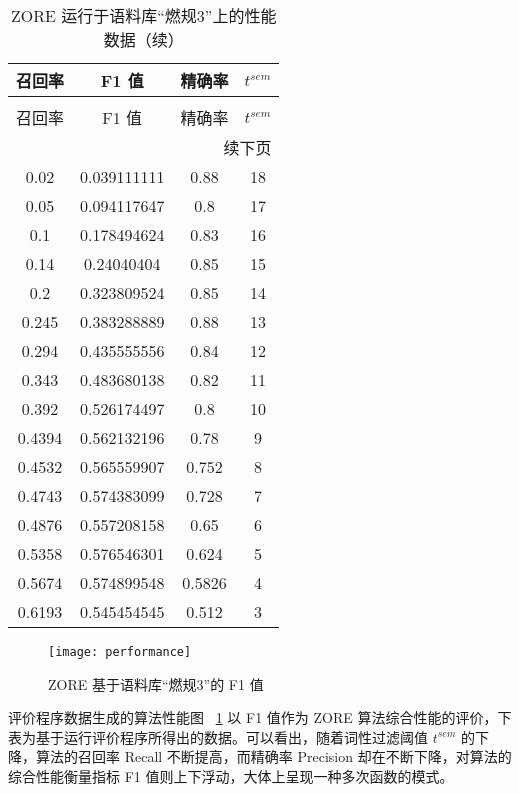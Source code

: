 \begin{longtable}{|c|c|c|c|}
\caption[ZORE 性能数据]{ZORE 运行于语料库“燃规3”上的性能数据} \label{tab:ZOREperformance} \\
\toprule[1.5pt]
 召回率 & F1 值 & 精确率 & $t^{sem}$\\
\midrule[1pt]
\endfirsthead
\caption[]{ZORE 运行于语料库“燃规3”上的性能数据（续）} \\
\toprule[1.5pt]
 召回率 & F1 值 & 精确率 & $t^{sem}$\\
\midrule[1pt]
\endhead
\hline
\multicolumn{4}{r}{\small 续下页}
\endfoot
\bottomrule[1.5pt]
\endlastfoot
0	&	0	&	1	&	19\\
    \hline
0.02	&	0.039111111	&	0.88	&	18\\
    \hline
0.05	&	0.094117647	&	0.8	&	17\\
    \hline
0.1	&	0.178494624	&	0.83	&	16\\
    \hline
0.14	&	0.24040404	&	0.85	&	15\\
    \hline
0.2	&	0.323809524	&	0.85	&	14\\
    \hline
0.245	&	0.383288889	&	0.88	&	13\\
    \hline
0.294	&	0.435555556	&	0.84	&	12\\
    \hline
0.343	&	0.483680138	&	0.82	&	11\\
    \hline
0.392	&	0.526174497	&	0.8	&	10\\
    \hline
0.4394	&	0.562132196	&	0.78	&	9\\
    \hline
0.4532	&	0.565559907	&	0.752	&	8\\
    \hline
0.4743	&	0.574383099	&	0.728	&	7\\
    \hline
0.4876	&	0.557208158	&	0.65	&	6\\
    \hline
0.5358	&	0.576546301	&	0.624	&	5\\
    \hline
0.5674	&	0.574899548	&	0.5826	&	4\\
    \hline
0.6193	&	0.545454545	&	0.512	&	3\\
\end{longtable}

\begin{figure}[t]
\centering
\texttt{[image: performance]}
\caption[ZORE 性能图]{ZORE 基于语料库“燃规3”的 F1 值}\label{fig:performance}
\end{figure}

评价程序数据生成的算法性能图 ~\ref{fig:performance} 以 F1 值作为 ZORE 算法综合性能的评价，下表为基于运行评价程序所得出的数据。可以看出，随着词性过滤阈值 $t^{sem}$ 的下降，算法的召回率 Recall 不断提高，而精确率 Precision 却在不断下降，对算法的综合性能衡量指标 F1 值则上下浮动，大体上呈现一种多次函数的模式。

